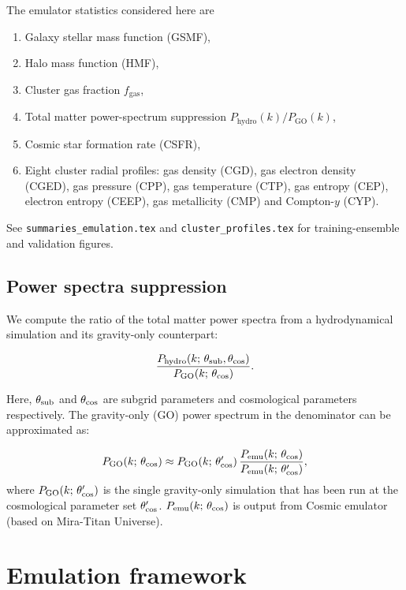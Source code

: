\documentclass{article}
\begin{document}
The emulator statistics considered here are
\begin{enumerate}
  \item Galaxy stellar mass function (GSMF),
  \item Halo mass function (HMF),
  \item Cluster gas fraction $f_\mathrm{gas}$,
  \item Total matter power-spectrum suppression $P_\mathrm{hydro}(k)/P_\mathrm{GO}(k)$,
  \item Cosmic star formation rate (CSFR),
  \item Eight cluster radial profiles: gas density (CGD), gas electron density (CGED), gas pressure (CPP), gas temperature (CTP), gas entropy (CEP), electron entropy (CEEP), gas metallicity (CMP) and Compton-$y$ (CYP).
\end{enumerate}
See \texttt{summaries\_emulation.tex} and \texttt{cluster\_profiles.tex} for training-ensemble and validation figures.

\subsection{Power spectra suppression}
We compute the ratio of the total matter power spectra from a hydrodynamical simulation and its gravity-only counterpart:

\begin{equation}
\frac{P_{\rm hydro}\!\left(k;\,\theta_{\rm sub}, \theta_{\rm cos}\right)}
     {P_{\rm GO}\!\left(k;\,\theta_{\rm cos}\right)} .
\end{equation}

Here, $\theta_{\rm sub}$ and $\theta_{\rm cos}$ are subgrid parameters and cosmological parameters respectively. The gravity-only (GO) power spectrum in the denominator can be approximated as:

\begin{equation}
P_{\rm GO}\!\left(k;\,\theta_{\rm cos}\right)
\approx
P_{\rm GO}\!\left(k;\,\theta_{\rm cos}'\right)
\frac{P_{\rm emu}\!\left(k;\,\theta_{\rm cos}\right)}
     {P_{\rm emu}\!\left(k;\,\theta_{\rm cos}'\right)} ,
\end{equation}
where $P_{\rm GO}\!\left(k;\,\theta_{\rm cos}'\right)$ is the single gravity-only simulation that has been run at the cosmological parameter set $\theta_{\rm cos}'$. $P_{\rm emu}\!\left(k;\,\theta_{\rm cos}\right)$ is output from Cosmic emulator (based on Mira-Titan Universe).

\section{Emulation framework}
\end{document}
